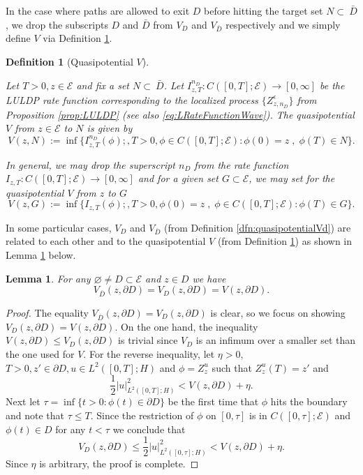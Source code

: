 \documentclass[10pt, reqno]{amsart}
\newcommand{\e}{\mathcal{E}}
\newtheorem{lem}{Lemma}
\newtheorem{dfn}{Definition}
\theoremstyle{definition}
\numberwithin{lem}{section}
\numberwithin{cor}{section}
\numberwithin{prop}{section}
\numberwithin{thm}{section}
\numberwithin{dfn}{section}
\begin{document}
In the case where paths are allowed to exit $D$ before hitting the target set $N\subset\ \bar{D}$, we drop the subscripts $D$ and $\bar{D}$ from $V_D$ and $V_{\bar{D}}$ respectively and we simply define $V$ via Definition \ref{dfn:quasipotential}.
\begin{dfn}[Quasipotential $V$]\label{dfn:quasipotential} 

Let $T>0, z\in\e$ and fix a set $N\subset\ \bar{D}$. Let $I^{n_{D}}_{z,T}: C([0,T];\e)\rightarrow [0,\infty]$ be the LULDP rate function corresponding to the localized process $\{Z^\epsilon_{z,n_D}\}$ from Proposition \ref{prop:LULDP} (see also  \eqref{eq:LRateFunctionWave}). The quasipotential $V$ from $z\in\e$ to $N$  is given by 
$$ V(z, N):=\inf\big\{ I^{n_D}_{z,T}(\phi); , T>0, \phi\in C([0,T];\e): \phi(0)=z\;,\;  \phi(T)\in N\big\}.       $$    

In general, we may drop the superscript $n_D$ from the rate function  $I_{z,T}: C([0,T];\e)\rightarrow [0,\infty]$  and for a given set $G\subset\e$, we may set for the quasipotential $V$ from $z$ to $G$  
     $$ V(z, G):=\inf\big\{ I_{z,T}(\phi);, T>0, \phi(0)=z\;,\; \phi\in C([0,T];\e):   \phi(T)\in G\big\}.       $$      
     \end{dfn}


In some particular cases, $V_D$ and $V_{\bar{D}}$ (from Definition \ref{dfn:quasipotentialVd}) are related to each other and to the quasipotential $V$ (from Definition \ref{dfn:quasipotential}) as shown in Lemma \ref{lem:VDequality} below.

\begin{lem}\label{lem:VDequality} For any $\varnothing\neq D\subset\e$ and $z\in D$ we have 
$$V_{\bar{D}}(z, \partial D)=V_D(z, \partial D)= V(z, \partial D).$$    
\end{lem}
\begin{proof} The equality $V_{\bar{D}}(z, \partial D)=V_D(z, \partial D)$ is clear, so we focus on showing $V_D(z, \partial D)= V(z, \partial D)$. On the one hand, the inequality $V(z, \partial D)\leq V_D(z, \partial D)$ is trivial since $V_D$ is an infimum over a smaller set than the one used for $V.$ For the reverse inequality, let $\eta>0,$ $T>0, z'\in\partial D, u\in L^2([0,T];H)$ and $\phi=Z^u_z$ such that $Z^u_z(T)=z'$ and 
$$  \frac{1}{2}|u|^2_{L^2([0,T];H)}<V(z, \partial D)+\eta.$$
Next let $\tau=\inf\{ t>0 : \phi(t)\in\partial D \}$ be the first time that $\phi$ hits the boundary and note that $\tau\leq T.$ Since the restriction of $\phi$ on $[0,
\tau]$ is in  $C([0,\tau];\e)$ and $\phi(t)\in D$ for any $t<\tau$ we conclude that 
$$  V_D(z, \partial D)\leq \frac{1}{2}|u|^2_{L^2([0,\tau];H)}<V(z, \partial D)+\eta.$$
Since $\eta$ is arbitrary, the proof is complete.
\end{proof}
\end{document}
